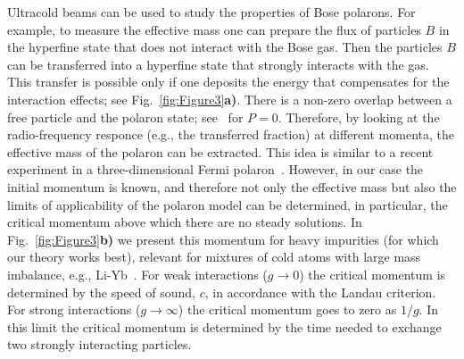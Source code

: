 \documentclass[twocolumn,amsmath,amssymb,showpacs,prl,superscriptaddress,aps]{revtex4-1}
\begin{document}
Ultracold beams can be used to study the properties of Bose polarons. For example, to measure the effective 
mass one can prepare the flux of particles $B$ in the hyperfine state that does not 
interact with the Bose gas. Then the particles $B$ can be transferred into a hyperfine state that strongly interacts with the gas.
This transfer is possible only if one deposits the energy that compensates for the interaction effects; see Fig.~\ref{fig:Figure3}{\bf a)}. 
There is a non-zero overlap between a free particle and the polaron state; see~\cite{volosniev2017} for $P=0$.
Therefore, by looking at the radio-frequency responce (e.g., the transferred fraction) at different momenta, the effective mass of the polaron can be extracted. 
This idea is similar to a recent experiment in a three-dimensional Fermi polaron~\cite{zaccanti2017}. However,
in our case the initial momentum is known, and therefore not only the effective mass but also the limits of applicability 
of the polaron model can be determined, in particular, the critical momentum above which there are no steady solutions.
In Fig.~\ref{fig:Figure3}{\bf b)} we present this momentum for heavy impurities (for which our theory works best), relevant 
for mixtures of cold atoms with large mass imbalance, e.g., Li-Yb~\cite{takahashi2018}.
For weak interactions ($g\to 0$) the critical momentum is determined by the speed of sound, $c$, in accordance with the Landau criterion.
For strong interactions ($g\to \infty$) the critical momentum goes to zero as $1/g$.  
In this limit the critical momentum is determined by the time needed to exchange two strongly interacting particles. 
 
\end{document}
